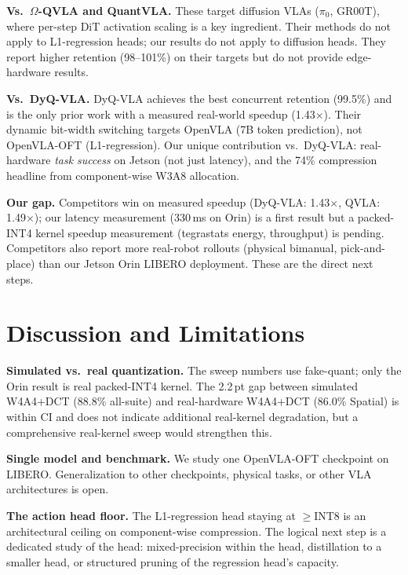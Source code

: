 \documentclass[conference]{IEEEtran}
\begin{document}
\textbf{Vs.\ $\Omega$-QVLA and QuantVLA.} These target diffusion VLAs ($\pi_0$, GR00T),
where per-step DiT activation scaling is a key ingredient. Their methods do not apply to
L1-regression heads; our results do not apply to diffusion heads. They report higher retention
(98--101\%) on their targets but do not provide edge-hardware results.

\textbf{Vs.\ DyQ-VLA.} DyQ-VLA achieves the best concurrent retention (99.5\%) and is
the only prior work with a measured real-world speedup (1.43$\times$). Their dynamic
bit-width switching targets OpenVLA (7B token prediction), not OpenVLA-OFT (L1-regression).
Our unique contribution vs.\ DyQ-VLA: real-hardware \emph{task success} on Jetson (not
just latency), and the 74\% compression headline from component-wise W3A8 allocation.

\textbf{Our gap.} Competitors win on measured speedup (DyQ-VLA: 1.43$\times$, QVLA:
1.49$\times$); our latency measurement (330\,ms on Orin) is a first result but a packed-INT4
kernel speedup measurement (tegrastats energy, throughput) is pending. Competitors also
report more real-robot rollouts (physical bimanual, pick-and-place) than our Jetson Orin
LIBERO deployment. These are the direct next steps.

\section{Discussion and Limitations}
\label{sec:discussion}

\textbf{Simulated vs.\ real quantization.} The sweep numbers use fake-quant; only the Orin
result is real packed-INT4 kernel. The 2.2\,pt gap between simulated W4A4+DCT
(88.8\% all-suite) and real-hardware W4A4+DCT (86.0\% Spatial) is within CI and does not
indicate additional real-kernel degradation, but a comprehensive real-kernel sweep would
strengthen this.

\textbf{Single model and benchmark.} We study one OpenVLA-OFT checkpoint on LIBERO.
Generalization to other checkpoints, physical tasks, or other VLA architectures is open.

\textbf{The action head floor.} The L1-regression head staying at $\geq$INT8 is an
architectural ceiling on component-wise compression. The logical next step is a dedicated
study of the head: mixed-precision within the head, distillation to a smaller head, or
structured pruning of the regression head's capacity.
\end{document}
